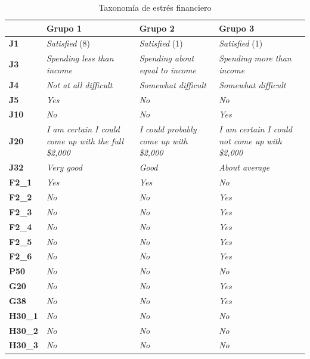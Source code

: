 \documentclass[a4paper, 11pt]{article}
\begin{document}
\begin{table}
\centering
\begin{tabular}{ |p{1cm}||p{3.2cm}|p{3.2cm}|p{3.2cm}|  }
\hline
  & \textbf{Grupo 1}  &  \textbf{Grupo 2} & \textbf{Grupo 3}\\
 \hline
  \hline
 \textbf{J1} & \textit{Satisfied} (8) & \textit{Satisfied} (1) & \textit{Satisfied} (1) \\
 \hline
 \textbf{J3} & \textit{Spending less than income} & \textit{Spending about equal to income} & \textit{Spending more than income} \\
 \hline
 \textbf{J4} & \textit{Not at all difficult} & \textit{Somewhat difficult} & \textit{Somewhat difficult} \\
 \hline
 \textbf{J5} & \textit{Yes} & \textit{No} & \textit{No}\\
 \hline
 \textbf{J10} & \textit{No} & \textit{No} & \textit{Yes} \\
 \hline
 \textbf{J20} & \textit{I am certain I could come up with the full \$2,000}& \textit{I could probably come up with \$2,000}
 & \textit{I am certain I could not come up with \$2,000}\\
 \hline
 \textbf{J32} & \textit{Very good} & \textit{Good}& \textit{About average} \\
 \hline
 \textbf{F2\_1} & \textit{Yes} & \textit{Yes} & \textit{No} \\
 \hline
 \textbf{F2\_2} & \textit{No} & \textit{No} & \textit{Yes}\\
 \hline
 \textbf{F2\_3} & \textit{No} & \textit{No} & \textit{Yes}\\
 \hline
 \textbf{F2\_4} & \textit{No} & \textit{No} & \textit{Yes}\\
 \hline
 \textbf{F2\_5} & \textit{No} & \textit{No} & \textit{Yes}\\
 \hline
 \textbf{F2\_6} & \textit{No} & \textit{No} & \textit{Yes}\\
 \hline
 \textbf{P50} & \textit{No} & \textit{No} & \textit{No}\\
 \hline
 \textbf{G20} & \textit{No} & \textit{No} & \textit{Yes}\\
 \hline
 \textbf{G38} & \textit{No} & \textit{No} & \textit{Yes}\\
 \hline
 \textbf{H30\_1} & \textit{No} & \textit{No} & \textit{No}\\
  \hline
 \textbf{H30\_2} & \textit{No} & \textit{No} & \textit{No}\\
  \hline
 \textbf{H30\_3} & \textit{No} & \textit{No} & \textit{No}\\
 \hline
\end{tabular}
    \caption{Taxonomía de estrés financiero}
    \label{tab:stress_taxonomy}
\end{table}
\end{document}

